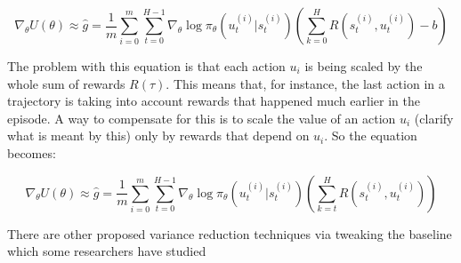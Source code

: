 \documentclass{../main.tex}{subfiles}
\begin{document}
\begin{equation}\label{equation:approximate-gradient-vanilla}
\nabla_{\theta}U(\theta) \approx \hat{g} = \frac{1}{m} \sum_{i = 0}^{m} \sum_{t=0}^{H-1} \nabla_{\theta} \log \pi_{\theta}(u_t^{(i)} | s_t^{(i)}) (\sum_{k=0}^{H}R(s_t^{(i)}, u_t^{(i)}) - b)
\end{equation}

The problem with this equation is that each action $u_i$ is being scaled by the whole sum of rewards $R(\tau)$. This means that, for instance, the last action in a trajectory is taking into account rewards that happened much earlier in the episode. A way to compensate for this is to scale the value of an action $u_i$ (clarify what is meant by this) only by rewards that depend on $u_i$. So the equation becomes:

\begin{equation}
\nabla_{\theta}U(\theta) \approx \hat{g} = \frac{1}{m} \sum_{i = 0}^{m} \sum_{t=0}^{H-1} \nabla_{\theta} \log \pi_{\theta}(u_t^{(i)} | s_t^{(i)}) (\sum_{k=t}^{H}R(s_t^{(i)}, u_t^{(i)}))
\end{equation}

There are other proposed variance reduction techniques via tweaking the baseline which some researchers have studied~\citep{Greensmith2004}
\end{document}
